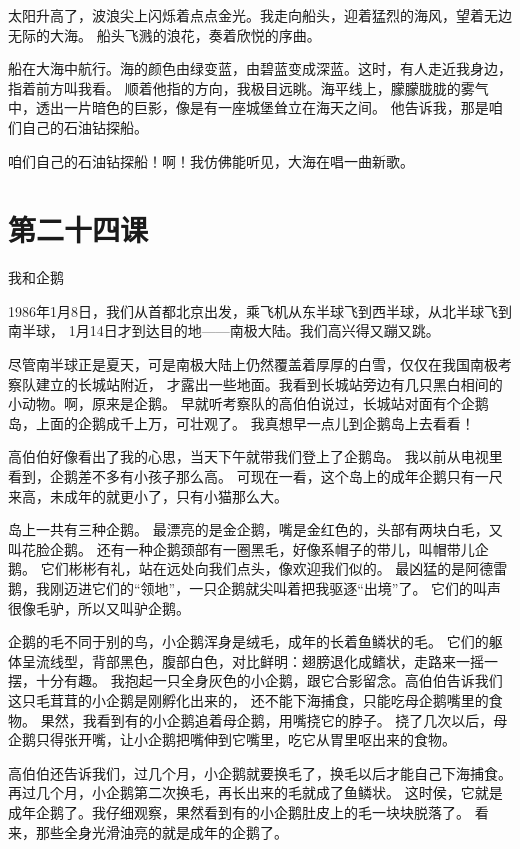 \documentclass[12pt,UTF8]{ctexbook}
\begin{document}
太阳升高了，波浪尖上闪烁着点点金光。我走向船头，迎着猛烈的海风，望着无边无际的大海。
船头飞溅的浪花，奏着欣悦的序曲。

船在大海中航行。海的颜色由绿变蓝，由碧蓝变成深蓝。这时，有人走近我身边，指着前方叫我看。
顺着他指的方向，我极目远眺。海平线上，朦朦胧胧的雾气中，透出一片暗色的巨影，像是有一座城堡耸立在海天之间。
他告诉我，那是咱们自己的石油钻探船。

咱们自己的石油钻探船！啊！我仿佛能听见，大海在唱一曲新歌。

\section{第二十四课}

我和企鹅

1986年1月8日，我们从首都北京出发，乘飞机从东半球飞到西半球，从北半球飞到南半球，
1月14日才到达目的地——南极大陆。我们高兴得又蹦又跳。

尽管南半球正是夏天，可是南极大陆上仍然覆盖着厚厚的白雪，仅仅在我国南极考察队建立的长城站附近，
才露出一些地面。我看到长城站旁边有几只黑白相间的小动物。啊，原来是企鹅。
早就听考察队的高伯伯说过，长城站对面有个企鹅岛，上面的企鹅成千上万，可壮观了。
我真想早一点儿到企鹅岛上去看看！

高伯伯好像看出了我的心思，当天下午就带我们登上了企鹅岛。
我以前从电视里看到，企鹅差不多有小孩子那么高。
可现在一看，这个岛上的成年企鹅只有一尺来高，未成年的就更小了，只有小猫那么大。

岛上一共有三种企鹅。
最漂亮的是金企鹅，嘴是金红色的，头部有两块白毛，又叫花脸企鹅。
还有一种企鹅颈部有一圈黑毛，好像系帽子的带儿，叫帽带儿企鹅。
它们彬彬有礼，站在远处向我们点头，像欢迎我们似的。
最凶猛的是阿德雷鹅，我刚迈进它们的“领地”，一只企鹅就尖叫着把我驱逐“出境”了。
它们的叫声很像毛驴，所以又叫驴企鹅。

企鹅的毛不同于别的鸟，小企鹅浑身是绒毛，成年的长着鱼鳞状的毛。
它们的躯体呈流线型，背部黑色，腹部白色，对比鲜明：翅膀退化成鳍状，走路来一摇一摆，十分有趣。
我抱起一只全身灰色的小企鹅，跟它合影留念。高伯伯告诉我们这只毛茸茸的小企鹅是刚孵化出来的，
还不能下海捕食，只能吃母企鹅嘴里的食物。
果然，我看到有的小企鹅追着母企鹅，用嘴挠它的脖子。
挠了几次以后，母企鹅只得张开嘴，让小企鹅把嘴伸到它嘴里，吃它从胃里呕出来的食物。

高伯伯还告诉我们，过几个月，小企鹅就要换毛了，换毛以后才能自己下海捕食。
再过几个月，小企鹅第二次换毛，再长出来的毛就成了鱼鳞状。
这时侯，它就是成年企鹅了。我仔细观察，果然看到有的小企鹅肚皮上的毛一块块脱落了。
看来，那些全身光滑油亮的就是成年的企鹅了。
\end{document}
